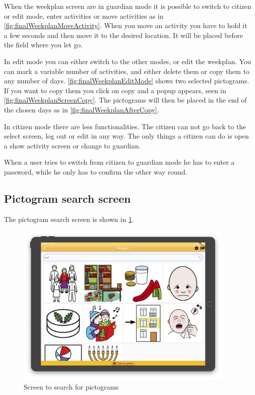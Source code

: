 When the weekplan screen are in guardian mode it is possible to switch to citizen or edit mode, enter activities or move activities as in \ref{fig:finalWeekplanMoveActivity}. When you move an activity you have to hold it a few seconds and then move it to the desired location. It will be placed before the field where you let go.

In edit mode you can either switch to the other modes, or edit the weekplan. You can mark a variable number of activities, and either delete them or copy them to any number of days. \ref{fig:finalWeekplanEditMode} shows two selected pictograms. If you want to copy them you click on copy and a popup appears, seen in \ref{fig:finalWeekplanScreenCopy}. The pictograms will then be placed in the end of the chosen days as in \ref{fig:finalWeekplanAfterCopy}.

In citizen mode there are less functionalities. The citizen can not go back to the select screen, log out or edit in any way. The only things a citizen can do is open a show activity screen or change to guardian.

When a user tries to switch from citizen to guardian mode he has to enter a password, while he only has to confirm the other way round.

\subsection{Pictogram search screen}
The pictogram search screen is shown in \ref{fig:finalPictogramSeach}.

\begin{figure}[H]
    \begin{center}
        \includegraphics[width=0.95\textwidth]{figures/FinalScreen/addPictogramScreen.png}
    \end{center}
    \caption{Screen to search for pictograms}
    \label{fig:finalPictogramSeach}
\end{figure}


